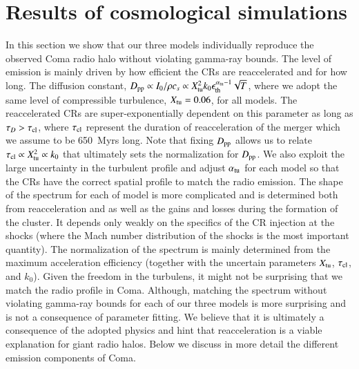 \documentclass[a4paper,fleqn,usenatbib]{mnras}
\begin{document}

\section{Results of cosmological simulations}
\label{sec:results}
In this section we show that our three models individually reproduce
the observed Coma radio halo without violating gamma-ray bounds. The
level of emission is mainly driven by how efficient the CRs are
reaccelerated and for how long. The diffusion constant,
$D_{\mathrm{pp}}\propto I_0/\rho c_s \propto
X_{\mathrm{tu}}^2k_0\epsilon_{\mathrm{th}}^{\alpha_{\mathrm{tu}}-1}\sqrt{T}$, where
we adopt the same level of compressible turbulence, $X_{\mathrm{tu}}=0.06$,
for all models. The reaccelerated CRs are super-exponentially
dependent on this parameter as long as $\tau_D > \tau_{\mathrm{cl}}$, where
$\tau_{\mathrm{cl}}$ represent the duration of reacceleration of the merger
which we assume to be 650~Myrs long. Note that fixing $D_{\mathrm{pp}}$
allows us to relate $\tau_{\mathrm{cl}} \propto X_{\mathrm{tu}}^2 \propto k_0$
that ultimately sets the normalization for $D_{\mathrm{pp}}$. We also
exploit the large uncertainty in the turbulent profile and adjust
$\alpha_{\mathrm{tu}}$ for each model so that the CRs have the correct
spatial profile to match the radio emission. The shape of the spectrum
for each of model is more complicated and is determined both from
reacceleration and as well as the gains and losses during the
formation of the cluster. It depends only weakly on the specifics of
the CR injection at the shocks (where the Mach number distribution of
the shocks is the most important quantity). The normalization of the
spectrum is mainly determined from the maximum acceleration efficiency
(together with the uncertain parameters $X_{\mathrm{tu}}$, $\tau_{\mathrm{cl}}$,
and $k_0$). Given the freedom in the turbulens, it might not be
surprising that we match the radio profile in Coma. Although, matching
the spectrum without violating gamma-ray bounds for each of our three
models is more surprising and is not a consequence of parameter
fitting. We believe that it is ultimately a consequence of the adopted
physics and hint that reacceleration is a viable explanation for giant
radio halos. Below we discuss in more detail the different emission
components of Coma.
\end{document}
